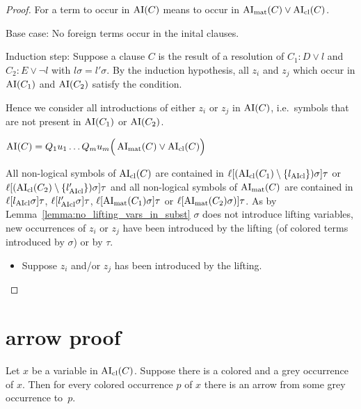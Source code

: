 \documentclass[,%
	paper=a4,%
	DIV12, %
	twoside=false,%
	liststotoc,
	bibtotoc,
	draft=false,%
	numbers=noendperiod
]{scrartcl}
\begin{document}
\begin{proof}
	For a term to occur in $\operatorname{AI}(C)$ means to occur in $\operatorname{AI}_\mathrm{mat}(C) \lor \operatorname{AI}_\mathrm{cl}(C)$.

	Base case: No foreign terms occur in the inital clauses.

	Induction step:
	Suppose a clause $C$ is the result of a resolution of $C_1: D \lor l$ and $C_2: E \lor \lnot l$ with $l\sigma = l'\sigma$.
	By the induction hypothesis, all $z_i$ and $z_j$ which occur in $\operatorname{AI}(C_1)$ and $\operatorname{AI}(C_2)$ satisfy the condition.

	Hence we consider all introductions of either $z_i$ or $z_j$ in $\operatorname{AI}(C)$, i.e.~symbols that are not present in $\operatorname{AI}(C_1)$ or $\operatorname{AI}(C_2)$.

	$\operatorname{AI}(C) = Q_1 u_1 \ldots Q_m u_m \Big( \operatorname{AI}_\mathrm{mat}(C) \lor \operatorname{AI}_\mathrm{cl}(C) \Big)$

	All non-logical symbols of
	$\operatorname{AI}_\mathrm{cl}(C)$ are contained in 
	$\ell[(\operatorname{AI}_\mathrm{cl}(C_1) \setminus \{l_{\operatorname{AIcl}}\})\sigma]\tau$ or $\lifboth{ (\AIclause(C_2)\setminus\nolinebreak \{l\fromclause'\})\sigma} \tau$ 
	and all non-logical symbols of 
	$\operatorname{AI}_\mathrm{mat}(C)$ are contained in $\ell[l_{\operatorname{AIcl}}\sigma]\tau$, $\ell[l'_{\operatorname{AIcl}}\sigma]\tau$, $\ell[\operatorname{AI}_\mathrm{mat}(C_1)\sigma]\tau$ or
	$\ell[\operatorname{AI}_\mathrm{mat}(C_2)\sigma) ]\tau$.
	As by Lemma~\ref{lemma:no_lifting_vars_in_subst} $\sigma$ does not introduce lifting variables, new occurrences of $z_i$ or $z_j$ have been introduced by the lifting (of colored terms introduced by $\sigma$) or by $\tau$.

	\begin{itemize}
			\item Suppose $z_i$ and/or $z_j$ has been introduced by the lifting.

	\end{itemize}






\end{proof}


\section{arrow proof}

\begin{conj}
	Let $x$ be a variable in $\operatorname{AI}_\mathrm{cl}(C)$.
	Suppose there is a colored and a grey occurrence of $x$.
	Then for every colored occurrence $p$ of $x$ there is an arrow from some grey occurrence to~$p$.
\end{conj}
\end{document}
